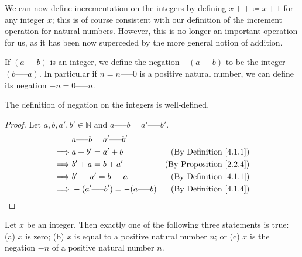 We can now define incrementation on the integers by defining \(x++ \coloneqq x + 1\) for any integer \(x\);
this is of course consistent with our definition of the increment operation for natural numbers.
However, this is no longer an important operation for us, as it has been now superceded by the more general notion of addition.

\begin{definition}\label{4.1.4}
If \((a \text{-----} b)\) is an integer, we define the negation \(-(a \text{-----} b)\) to be the integer \((b \text{-----} a)\).
In particular if \(n = n \text{-----} 0\) is a positive natural number, we can define its negation \(-n = 0 \text{-----} n\).
\end{definition}

\begin{additional corollary}\label{ac 4.1.2}
The definition of negation on the integers is well-defined.
\end{additional corollary}

\begin{proof}
Let \(a, b, a', b' \in \mathds{N}\) and \(a \text{-----} b = a' \text{-----} b'\).
\begin{align*}
& a \text{-----} b = a' \text{-----} b' \\
\implies & a + b' = a' + b & \text{(By Definition \ref{4.1.1})} \\
\implies & b' + a = b + a' & \text{(By Proposition \ref{2.2.4})} \\
\implies & b' \text{-----} a' = b \text{-----} a & \text{(By Definition \ref{4.1.1})} \\
\implies & -(a' \text{-----} b') = -(a \text{-----} b) & \text{(By Definition \ref{4.1.4})} \\
\end{align*}
\end{proof}

\begin{lemma}\label{4.1.5}
Let \(x\) be an integer.
Then exactly one of the following three statements is true:
(a) \(x\) is zero;
(b) \(x\) is equal to a positive natural number \(n\);
or (c) \(x\) is the negation \(-n\) of a positive natural number \(n\).
\end{lemma}

